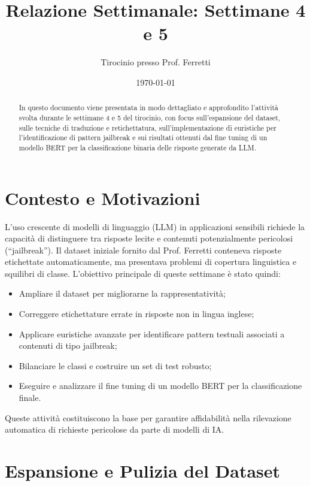 \documentclass[a4paper,12pt]{article}
\title{Relazione Settimanale: Settimane 4 e 5}
\author{Tirocinio presso Prof. Ferretti}
\date{\today}
\begin{document}
\maketitle

\begin{abstract}
In questo documento viene presentata in modo dettagliato e approfondito l'attività svolta durante le settimane 4 e 5 del tirocinio, con focus sull'espansione del dataset, sulle tecniche di traduzione e retichettatura, sull'implementazione di euristiche per l'identificazione di pattern jailbreak e sui risultati ottenuti dal fine tuning di un modello BERT per la classificazione binaria delle risposte generate da LLM.
\end{abstract}

\tableofcontents
\newpage

\section{Contesto e Motivazioni}
L'uso crescente di modelli di linguaggio (LLM) in applicazioni sensibili richiede la capacità di distinguere tra risposte lecite e contenuti potenzialmente pericolosi (``jailbreak''). Il dataset iniziale fornito dal Prof. Ferretti conteneva risposte etichettate automaticamente, ma presentava problemi di copertura linguistica e squilibri di classe. L'obiettivo principale di queste settimane è stato quindi:
\begin{itemize}
  \item Ampliare il dataset per migliorarne la rappresentatività;
  \item Correggere etichettature errate in risposte non in lingua inglese;
  \item Applicare euristiche avanzate per identificare pattern testuali associati a contenuti di tipo jailbreak;
  \item Bilanciare le classi e costruire un set di test robusto;
  \item Eseguire e analizzare il fine tuning di un modello BERT per la classificazione finale.
\end{itemize}
Queste attività costituiscono la base per garantire affidabilità nella rilevazione automatica di richieste pericolose da parte di modelli di IA.

\section{Espansione e Pulizia del Dataset}
\end{document}
